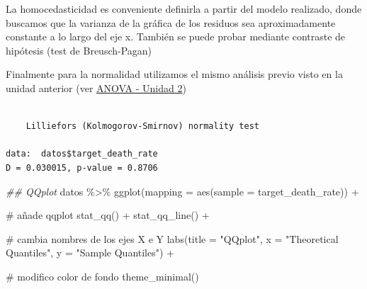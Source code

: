 \documentclass[
  letterpaper,
  DIV=11,
  numbers=noendperiod]{scrartcl}
\newenvironment{Shaded}{\begin{snugshade}}{\end{snugshade}}
\newcommand{\AttributeTok}[1]{\textcolor[rgb]{0.40,0.45,0.13}{#1}}
\newcommand{\CommentTok}[1]{\textcolor[rgb]{0.37,0.37,0.37}{#1}}
\newcommand{\DocumentationTok}[1]{\textcolor[rgb]{0.37,0.37,0.37}{\textit{#1}}}
\newcommand{\FunctionTok}[1]{\textcolor[rgb]{0.28,0.35,0.67}{#1}}
\newcommand{\NormalTok}[1]{\textcolor[rgb]{0.00,0.23,0.31}{#1}}
\newcommand{\SpecialCharTok}[1]{\textcolor[rgb]{0.37,0.37,0.37}{#1}}
\newcommand{\StringTok}[1]{\textcolor[rgb]{0.13,0.47,0.30}{#1}}
\begin{document}
La homocedasticidad es conveniente definirla a partir del modelo
realizado, donde buscamos que la varianza de la gráfica de los residuos
sea aproximadamente constante a lo largo del eje x. También se puede
probar mediante contraste de hipótesis (test de Breusch-Pagan)

Finalmente para la normalidad utilizamos el mismo análisis previo visto
en la unidad anterior (ver
\href{https://cballejo.github.io/R_Epi_Avanzada/Unidad2/Anova/}{ANOVA -
Unidad 2})

\begin{Shaded}
\end{Shaded}

\begin{verbatim}

    Lilliefors (Kolmogorov-Smirnov) normality test

data:  datos$target_death_rate
D = 0.030015, p-value = 0.8706
\end{verbatim}

\begin{Shaded}
\begin{Highlighting}[]
\DocumentationTok{\#\# QQplot}
\NormalTok{datos }\SpecialCharTok{\%\textgreater{}\%} 
  \FunctionTok{ggplot}\NormalTok{(}\AttributeTok{mapping =} \FunctionTok{aes}\NormalTok{(}\AttributeTok{sample =}\NormalTok{ target\_death\_rate)) }\SpecialCharTok{+}
  
  \CommentTok{\# añade qqplot}
  \FunctionTok{stat\_qq}\NormalTok{() }\SpecialCharTok{+}
  \FunctionTok{stat\_qq\_line}\NormalTok{() }\SpecialCharTok{+}
  
  \CommentTok{\# cambia nombres de los ejes X e Y}
  \FunctionTok{labs}\NormalTok{(}\AttributeTok{title =} \StringTok{"QQplot"}\NormalTok{, }
       \AttributeTok{x =} \StringTok{"Theoretical Quantiles"}\NormalTok{, }
       \AttributeTok{y =} \StringTok{"Sample Quantiles"}\NormalTok{) }\SpecialCharTok{+}
  
  \CommentTok{\# modifico color de fondo}
  \FunctionTok{theme\_minimal}\NormalTok{()}
\end{Highlighting}
\end{Shaded}
\end{document}
